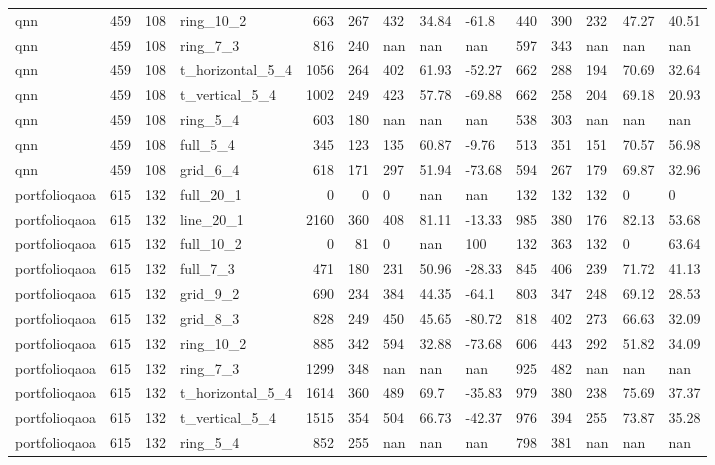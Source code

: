 \begin{longtable}{lrrlrrlllrrlll}
qnn & 459 & 108 & ring\_10\_2 & 663 & 267 & 432 & 34.84 & -61.8 & 440 & 390 & 232 & 47.27 & 40.51 \\
qnn & 459 & 108 & ring\_7\_3 & 816 & 240 & nan & nan & nan & 597 & 343 & nan & nan & nan \\
qnn & 459 & 108 & t\_horizontal\_5\_4 & 1056 & 264 & 402 & 61.93 & -52.27 & 662 & 288 & 194 & 70.69 & 32.64 \\
qnn & 459 & 108 & t\_vertical\_5\_4 & 1002 & 249 & 423 & 57.78 & -69.88 & 662 & 258 & 204 & 69.18 & 20.93 \\
qnn & 459 & 108 & ring\_5\_4 & 603 & 180 & nan & nan & nan & 538 & 303 & nan & nan & nan \\
qnn & 459 & 108 & full\_5\_4 & 345 & 123 & 135 & 60.87 & -9.76 & 513 & 351 & 151 & 70.57 & 56.98 \\
qnn & 459 & 108 & grid\_6\_4 & 618 & 171 & 297 & 51.94 & -73.68 & 594 & 267 & 179 & 69.87 & 32.96 \\
portfolioqaoa & 615 & 132 & full\_20\_1 & 0 & 0 & 0 & nan & nan & 132 & 132 & 132 & 0 & 0 \\
portfolioqaoa & 615 & 132 & line\_20\_1 & 2160 & 360 & 408 & 81.11 & -13.33 & 985 & 380 & 176 & 82.13 & 53.68 \\
portfolioqaoa & 615 & 132 & full\_10\_2 & 0 & 81 & 0 & nan & 100 & 132 & 363 & 132 & 0 & 63.64 \\
portfolioqaoa & 615 & 132 & full\_7\_3 & 471 & 180 & 231 & 50.96 & -28.33 & 845 & 406 & 239 & 71.72 & 41.13 \\
portfolioqaoa & 615 & 132 & grid\_9\_2 & 690 & 234 & 384 & 44.35 & -64.1 & 803 & 347 & 248 & 69.12 & 28.53 \\
portfolioqaoa & 615 & 132 & grid\_8\_3 & 828 & 249 & 450 & 45.65 & -80.72 & 818 & 402 & 273 & 66.63 & 32.09 \\
portfolioqaoa & 615 & 132 & ring\_10\_2 & 885 & 342 & 594 & 32.88 & -73.68 & 606 & 443 & 292 & 51.82 & 34.09 \\
portfolioqaoa & 615 & 132 & ring\_7\_3 & 1299 & 348 & nan & nan & nan & 925 & 482 & nan & nan & nan \\
portfolioqaoa & 615 & 132 & t\_horizontal\_5\_4 & 1614 & 360 & 489 & 69.7 & -35.83 & 979 & 380 & 238 & 75.69 & 37.37 \\
portfolioqaoa & 615 & 132 & t\_vertical\_5\_4 & 1515 & 354 & 504 & 66.73 & -42.37 & 976 & 394 & 255 & 73.87 & 35.28 \\
portfolioqaoa & 615 & 132 & ring\_5\_4 & 852 & 255 & nan & nan & nan & 798 & 381 & nan & nan & nan \\

\end{longtable}
